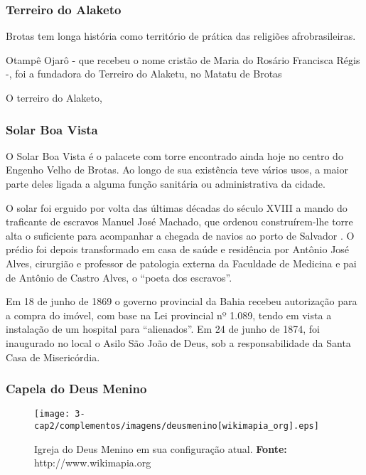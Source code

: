 \subsubsection{Terreiro do Alaketo}

Brotas tem longa história como território de prática das religiões afrobrasileiras. 


Otampê Ojarô - que recebeu o nome cristão de Maria do Rosário Francisca Régis -, foi a fundadora do Terreiro do Alaketu, no Matatu de Brotas


O terreiro do Alaketo,

\subsubsection{Solar Boa Vista}

O Solar Boa Vista é o palacete com torre encontrado ainda hoje no centro do Engenho Velho de Brotas. Ao longo de sua existência teve vários usos, a maior parte deles ligada a alguma função sanitária ou administrativa da cidade.

O solar foi erguido por volta das últimas décadas do século XVIII a mando do traficante de escravos Manuel José Machado, que ordenou construírem-lhe torre alta o suficiente para acompanhar a chegada de navios ao porto de Salvador \cite[p.~127]{mattos_panorama_2011}. O prédio foi depois transformado em casa de saúde e residência por Antônio José Alves, cirurgião e professor de patologia externa da Faculdade de Medicina e pai de Antônio de Castro Alves, o ``poeta dos escravos''.  

Em 18 de junho de 1869 o governo provincial da Bahia recebeu autorização para a compra do imóvel, com base na Lei provincial nº 1.089, tendo em vista a instalação de um hospital para ``alienados''. Em 24 de junho de 1874, foi inaugurado no local o Asilo São João de Deus, sob a responsabilidade da Santa Casa de Misericórdia.

\subsubsection{Capela do Deus Menino}

\begin{figure}[!htp]
\centering
\texttt{[image: 3-cap2/complementos/imagens/deusmenino[wikimapia\_org].eps]} 
\caption{Igreja do Deus Menino em sua configuração atual. \textbf{Fonte:} http://www.wikimapia.org}
\end{figure}

